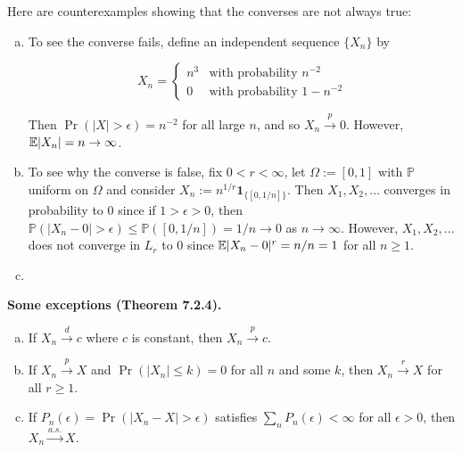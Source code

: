 \begin{remark}

Here are counterexamples showing that the converses are not always true:

\begin{enumerate}[(a)]

\item To see the converse fails, define an independent sequence \(\{X_n\}\) by 

\[
X_n = \begin{cases}
n^3 & \text{with probability } n^{-2} \\
0 & \text{with probability } 1 - n^{-2}
\end{cases}
\]

Then \(\Pr(|X| > \epsilon) = n^{-2}\) for all large \(n\), and so \(X_n \xrightarrow{p} 0\). However, \(\mathbb{E}|X_n| = n \to \infty\).

\item To see why the converse is false, fix \(0 < r < \infty\), let \(\Omega:= [0,1]\) with \(\mathbb{P}\) uniform on \(\Omega\) and consider \(X_n := n^{1/r} \boldsymbol{1}_{\{[0,1/n]\}}\). Then \(X_1, X_2, \ldots\) converges in probability to 0 since if \(1 > \epsilon > 0\), then \(\mathbb{P}(|X_n - 0| > \epsilon) \leq \mathbb{P}([0, 1/n]) = 1/n \to 0\) as \(n \to \infty\). However, \(X_1, X_2, \ldots\) does not converge in \(L_r\) to 0 since \(\mathbb{E}|X_n -0|^r =n/n =1\) for all \(n \geq 1\).

\item

\end{enumerate}

\end{remark}

\begin{theorem}\label{asym.7.2.4}\textbf{Some exceptions (Theorem 7.2.4).}

\begin{enumerate}[(a)]

\item If \(X_n \xrightarrow{d} c\) where \(c\) is constant, then \(X_n \xrightarrow{p} c\).

\item If \(X_n \xrightarrow{p} X\) and \(\Pr(|X_n| \leq k) = 0\) for all \(n\) and some \(k\), then \(X_n \xrightarrow{r} X\) for all \(r \geq 1\).

\item If \(P_n(\epsilon) = \Pr(|X_n - X| > \epsilon)\) satisfies \(\sum_n P_n(\epsilon) < \infty\) for all \(\epsilon > 0\), then \(X_n \xrightarrow{a.s.} X\). 

\end{enumerate}
\end{theorem}

